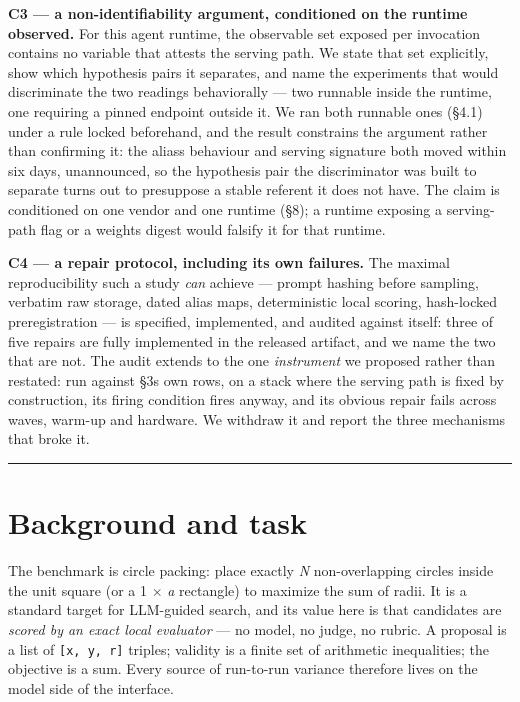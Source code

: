 \textbf{C3 --- a non-identifiability argument, conditioned on the runtime observed.} For this agent runtime, the observable set exposed per invocation contains no variable that attests the serving path. We state that set explicitly, show which hypothesis pairs it separates, and name the experiments that would discriminate the two readings behaviorally --- two runnable inside the runtime, one requiring a pinned endpoint outside it. We ran both runnable ones (§4.1) under a rule locked beforehand, and the result constrains the argument rather than confirming it: the alias\textquotesingle s behaviour and serving signature both moved within six days, unannounced, so the hypothesis pair the discriminator was built to separate turns out to presuppose a stable referent it does not have. The claim is conditioned on one vendor and one runtime (§8); a runtime exposing a serving-path flag or a weights digest would falsify it for that runtime.

\textbf{C4 --- a repair protocol, including its own failures.} The maximal reproducibility such a study \emph{can} achieve --- prompt hashing before sampling, verbatim raw storage, dated alias maps, deterministic local scoring, hash-locked preregistration --- is specified, implemented, and audited against itself: three of five repairs are fully implemented in the released artifact, and we name the two that are not. The audit extends to the one \emph{instrument} we proposed rather than restated: run against §3\textquotesingle s own rows, on a stack where the serving path is fixed by construction, its firing condition fires anyway, and its obvious repair fails across waves, warm-up and hardware. We withdraw it and report the three mechanisms that broke it.

\begin{center}\rule{0.5\linewidth}{0.5pt}\end{center}

\hypertarget{background-and-task}{%
\section{Background and task}\label{background-and-task}}

The benchmark is circle packing: place exactly \emph{N} non-overlapping circles inside the unit square (or a 1 \(\times\) \emph{a} rectangle) to maximize the sum of radii. It is a standard target for LLM-guided search, and its value here is that candidates are \emph{scored by an exact local evaluator} --- no model, no judge, no rubric. A proposal is a list of \texttt{{[}x,\ y,\ r{]}} triples; validity is a finite set of arithmetic inequalities; the objective is a sum. Every source of run-to-run variance therefore lives on the model side of the interface.

